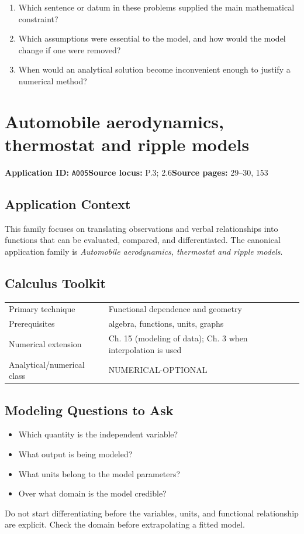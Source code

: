 \documentclass[11pt]{book}
\newcommand{\pid}[1]{\texttt{#1}}
\begin{document}
\begin{reflectionbox}\begin{enumerate}
\item Which sentence or datum in these problems supplied the main mathematical constraint?
\item Which assumptions were essential to the model, and how would the model change if one were removed?
\item When would an analytical solution become inconvenient enough to justify a numerical method?
\end{enumerate}\end{reflectionbox}
\chapter{Automobile aerodynamics, thermostat and ripple models}\label{app:A005}
\textbf{Application ID:} \pid{A005}\quad \textbf{Source locus:} P.3; 2.6\quad \textbf{Source pages:} 29–30, 153
\section*{Application Context}
This family focuses on translating observations and verbal relationships into functions that can be evaluated, compared, and differentiated. The canonical application family is \emph{Automobile aerodynamics, thermostat and ripple models}.
\section*{Calculus Toolkit}
\begin{tabularx}{\textwidth}{@{}lX@{}}\toprule
Primary technique & Functional dependence and geometry \\
Prerequisites & algebra, functions, units, graphs \\
Numerical extension & Ch. 15 (modeling of data); Ch. 3 when interpolation is used \\
Analytical/numerical class & NUMERICAL-OPTIONAL \\
\bottomrule\end{tabularx}
\section*{Modeling Questions to Ask}\begin{itemize}
\item Which quantity is the independent variable?
\item What output is being modeled?
\item What units belong to the model parameters?
\item Over what domain is the model credible?
\end{itemize}
\begin{errorbox}Do not start differentiating before the variables, units, and functional relationship are explicit. Check the domain before extrapolating a fitted model.\end{errorbox}
\end{document}
